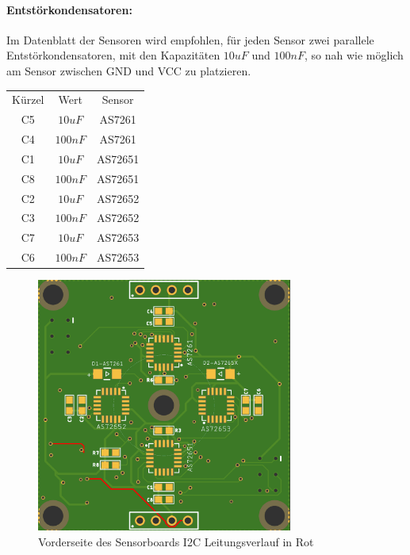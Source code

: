 \paragraph{Entstörkondensatoren:} Im Datenblatt der Sensoren wird empfohlen, für jeden Sensor zwei parallele Entstörkondensatoren, mit den Kapazitäten $10uF$ und $100nF$, so nah wie möglich am Sensor zwischen GND und VCC zu platzieren.


\begin{center}
\begin{tabular}{ c c c }
 Kürzel & Wert & Sensor \\ 
 C5 & $10uF$ & AS7261 \\  
 C4 & $100nF$ & AS7261 \\
 C1 & $10uF$ & AS72651 \\  
 C8 & $100nF$ & AS72651 \\
 C2 & $10uF$ & AS72652 \\  
 C3 & $100nF$ & AS72652 \\
 C7 & $10uF$ & AS72653 \\  
 C6 & $100nF$ & AS72653 \\
\end{tabular}
\end{center}

\begin{figure}[H]
\centering
\includegraphics[width=0.75\textwidth]{img/Sensor-platiene_front}
\caption{Vorderseite des Sensorboards I2C Leitungsverlauf in Rot}
\label{fig:Sensor-platiene_front}
\end{figure}

